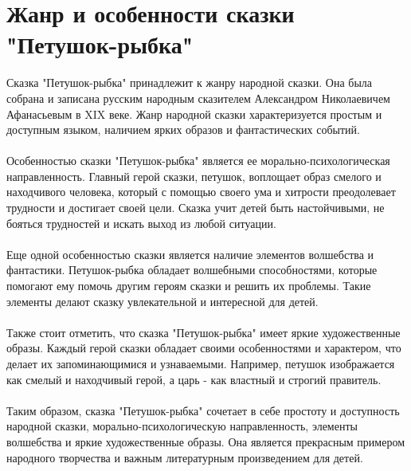 \documentclass{article}
\begin{document}
\section{Жанр и особенности сказки "{}Петушок-рыбка"{}}
Сказка "{}Петушок-рыбка"{} принадлежит к жанру народной сказки. Она была собрана и записана русским народным сказителем Александром Николаевичем Афанасьевым в XIX веке. Жанр народной сказки характеризуется простым и доступным языком, наличием ярких образов и фантастических событий.\\
~\\
Особенностью сказки "{}Петушок-рыбка"{} является ее морально-психологическая направленность. Главный герой сказки, петушок, воплощает образ смелого и находчивого человека, который с помощью своего ума и хитрости преодолевает трудности и достигает своей цели. Сказка учит детей быть настойчивыми, не бояться трудностей и искать выход из любой ситуации.\\
~\\
Еще одной особенностью сказки является наличие элементов волшебства и фантастики. Петушок-рыбка обладает волшебными способностями, которые помогают ему помочь другим героям сказки и решить их проблемы. Такие элементы делают сказку увлекательной и интересной для детей.\\
~\\
Также стоит отметить, что сказка "{}Петушок-рыбка"{} имеет яркие художественные образы. Каждый герой сказки обладает своими особенностями и характером, что делает их запоминающимися и узнаваемыми. Например, петушок изображается как смелый и находчивый герой, а царь - как властный и строгий правитель.\\
~\\
Таким образом, сказка "{}Петушок-рыбка"{} сочетает в себе простоту и доступность народной сказки, морально-психологическую направленность, элементы волшебства и яркие художественные образы. Она является прекрасным примером народного творчества и важным литературным произведением для детей.
\end{document}
